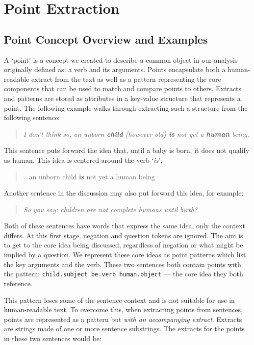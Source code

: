 \chapter{Point Extraction\label{chap:point-extraction}}
  \section{Point Concept Overview and Examples}
    A `point' is a concept we created to describe a common object in our analysis --- originally defined as: a verb and its arguments. Points encapsulate both a human-readable extract from the text as well as a pattern representing the core components that can be used to match and compare points to others. Extracts and patterns are stored as attributes in a key-value structure that represents a point. The following example walks through extracting such a structure from the following sentence:

    \smallskip
    \begin{center}
      \blockquote{\textit{I don't think so, an unborn \textbf{child} (however old) \textbf{is} not yet a \textbf{human} being.}}
    \end{center}
    \smallskip

    This sentence puts forward the idea that, until a baby is born, it does not qualify as human. This idea is centered around the verb `\textit{is}', \blockquote{...an unborn child \textbf{is} not yet a human being}. Another sentence in the discussion may also put forward this idea, for example: \blockquote{\textit{So you say: children are not complete humans until birth?}}. Both of these sentences have words that express the same idea, only the context differs. At this first stage, negation and question tokens are ignored. The aim is to get to the core idea being discussed, regardless of negation or what might be implied by a question. We represent these core ideas as point patterns which list the key arguments and the verb. These two sentences both contain points with the pattern: \texttt{child.subject be.verb human.object} --- the core idea they both reference.

    This pattern loses some of the sentence context and is not suitable for use in human-readable text. To overcome this, when extracting points from sentences, points are represented as a pattern but \textit{with an accompanying extract}. Extracts are strings made of one or more sentence substrings. The extracts for the points in these two sentences would be:

